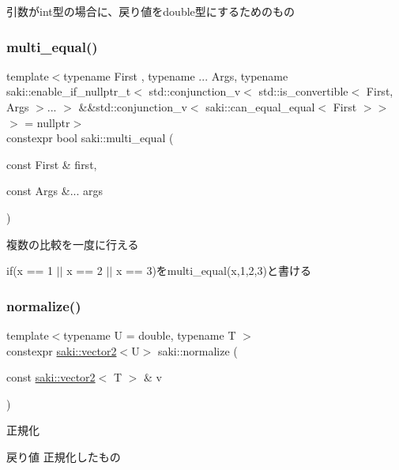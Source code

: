 引数がint型の場合に、戻り値をdouble型にするためのもの 

\mbox{\label{namespacesaki_aa15664a63445d3539b40b774e556a45b}} 
\subsubsection{\texorpdfstring{multi\+\_\+equal()}{multi\_equal()}}
{\footnotesize\ttfamily template$<$typename First , typename ... Args, typename saki\+::enable\+\_\+if\+\_\+nullptr\+\_\+t$<$ std\+::conjunction\+\_\+v$<$ std\+::is\+\_\+convertible$<$ First, Args $>$... $>$ \&\&std\+::conjunction\+\_\+v$<$ saki\+::can\+\_\+equal\+\_\+equal$<$ First $>$$>$ $>$  = nullptr$>$ \\
constexpr bool saki\+::multi\+\_\+equal (\begin{DoxyParamCaption}\item[{const First \&}]{first,  }\item[{const Args \&...}]{args }\end{DoxyParamCaption})}



複数の比較を一度に行える 

if(x == 1 $\vert$$\vert$ x == 2 $\vert$$\vert$ x == 3)をmulti\+\_\+equal(x,1,2,3)と書ける \mbox{\label{namespacesaki_a0ca208fb45c585d9cd23276fb91e40ee}} 
\subsubsection{\texorpdfstring{normalize()}{normalize()}\hspace{0.1cm}{\footnotesize\ttfamily [1/3]}}
{\footnotesize\ttfamily template$<$typename U  = double, typename T $>$ \\
constexpr \mbox{\hyperlink{classsaki_1_1vector2}{saki\+::vector2}}$<$U$>$ saki\+::normalize (\begin{DoxyParamCaption}\item[{const \mbox{\hyperlink{classsaki_1_1vector2}{saki\+::vector2}}$<$ T $>$ \&}]{v }\end{DoxyParamCaption})}



正規化 

\begin{DoxyReturn}{戻り値}
正規化したもの 
\end{DoxyReturn}
\mbox{\label{namespacesaki_aa38ed490dc1e7d5df7241eefd1c9453b}} 
